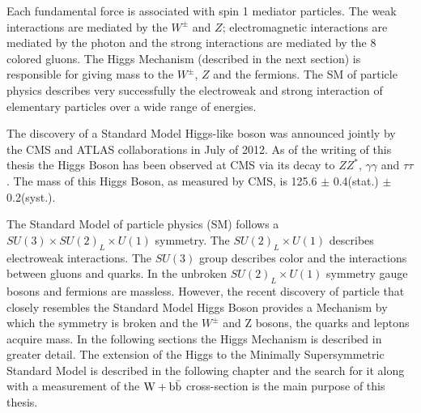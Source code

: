 Each fundamental force is associated with spin 1 mediator particles.
The weak interactions are mediated by the $W^{\pm}$ and $Z$;
electromagnetic interactions are mediated by the photon and the strong interactions
are mediated by the 8 colored gluons. The Higgs Mechanism (described in the next section) 
is responsible for giving mass to the $W^{\pm}$, $Z$ and the fermions. 
The SM of particle physics describes very successfully the electroweak and strong
interaction of elementary particles over a wide range of energies.

The discovery of a Standard Model Higgs-like boson was announced jointly 
by the CMS and ATLAS collaborations in July of 2012. %
As of the writing of this thesis the Higgs Boson has been observed at CMS via
its decay to $ZZ^{*}$, $\gamma\gamma$ and $\tau\tau$. The mass of this
Higgs Boson, as measured by CMS, is 125.6 $\pm$ 0.4(stat.) $\pm$ 0.2(syst.).

The Standard Model of particle physics (SM) follows a $SU(3)\times SU(2)_{L}\times U(1)$ %
symmetry. The $SU(2)_{L}\times U(1)$ describes electroweak interactions.
The $SU(3)$ group describes color and the interactions
between gluons and quarks. In the unbroken $SU(2)_{L}\times U(1)$ symmetry
gauge bosons and fermions are massless. However, the recent
discovery of particle that closely resembles the Standard Model Higgs
Boson provides a Mechanism by which the symmetry is broken
and the $W^{\pm}$ and Z bosons, the quarks and leptons acquire mass. 
In the following sections the Higgs Mechanism is described in greater detail.
The extension of the Higgs to the Minimally Supersymmetric Standard Model
is described in the following chapter and the search for it along with
a measurement of the $\mathrm{W+\mathrm{b\bar{b}}}$ cross-section is the main purpose of this
thesis.
